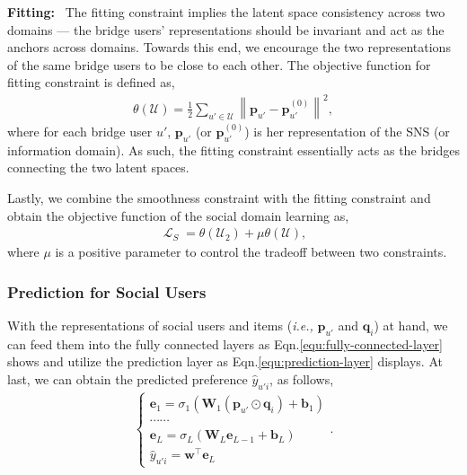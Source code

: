 \documentclass[sigconf]{acmart}
\newcommand\norm[1]{\left\lVert#1\right\rVert}
\newcommand{\Lapl}{\mathbf{\mathop{\mathcal{L}}}}
\newcommand{\Trans}[1]{{#1}^{\top}}
\newcommand{\Mat}[1]{\mathbf{#1}}
\newcommand{\Set}[1]{\mathcal{#1}}
\newcommand{\ie}{\emph{i.e., }}
\begin{document}
\textbf{Fitting:}
~The fitting constraint implies the latent space consistency across two domains --- the bridge users' representations should be invariant and act as the anchors across domains. Towards this end, we encourage the two representations of the same bridge users to be close to each other. The objective function for fitting constraint is defined as,
\begin{gather}\label{equ:fitting}
\theta(\Set{U})=\frac{1}{2}\sum_{u'\in\Set{U}}\norm{\Mat{p}_{u'}-\Mat{p}_{u'}^{(0)}}^{2},
\end{gather}
where for each bridge user $u'$, $\Mat{p}_{u'}$ (or $\Mat{p}_{u'}^{(0)}$) is her representation of the SNS (or information domain). As such, the fitting constraint essentially acts as the bridges connecting the two latent spaces.

Lastly, we combine the smoothness constraint with the fitting constraint and obtain the objective function of the social domain learning as,
\begin{gather}
\Lapl_{S}=\theta(\Set{U}_{2})+\mu\theta(\Set{U}),
\end{gather}
where $\mu$ is a positive parameter to control the tradeoff between two constraints.



\subsubsection{\textbf{Prediction for Social Users}}
With the representations of social users and items (\ie $\Mat{p}_{u'}$ and $\Mat{q}_{i}$) at hand, we can feed them into the fully connected layers as Eqn.\eqref{equ:fully-connected-layer} shows and utilize the prediction layer as Eqn.\eqref{equ:prediction-layer} displays. At last, we can obtain the predicted preference $\widehat{y}_{u'i}$, as follows,
\begin{gather}
\begin{cases}
\Mat{e}_{1}=\sigma_{1}(\Mat{W}_{1}(\Mat{p}_{u'}\odot\Mat{q}_{i})+\Mat{b}_{1})\\
\cdots\cdots\\
\Mat{e}_{L}=\sigma_{L}(\Mat{W}_{L}\Mat{e}_{L-1}+\Mat{b}_{L})\\
\widehat{y}_{u'i}=\Trans{\Mat{w}}\Mat{e}_{L}
\end{cases}.
\end{gather}
\end{document}
